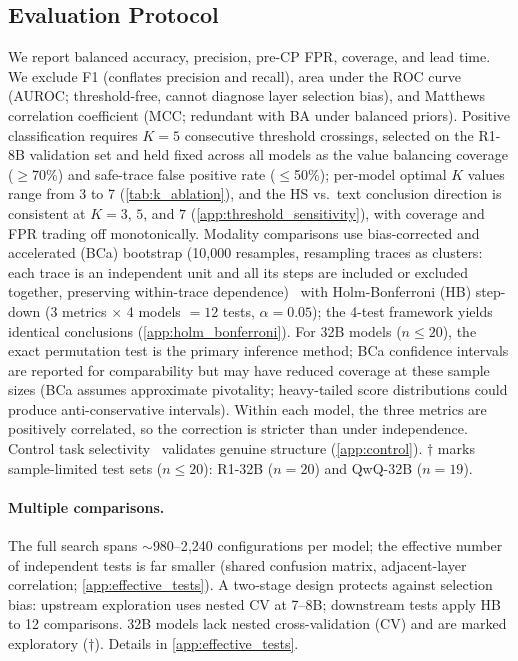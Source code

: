 \subsection{Evaluation Protocol}
\label{sec:evaluation}

We report balanced accuracy, precision, pre-CP FPR, coverage, and lead time. We exclude F1 (conflates precision and recall), area under the ROC curve (AUROC; threshold-free, cannot diagnose layer selection bias), and Matthews correlation coefficient (MCC; redundant with BA under balanced priors). Positive classification requires $K{=}5$ consecutive threshold crossings, selected on the R1-8B validation set and held fixed across all models as the value balancing coverage ($\geq$70\%) and safe-trace false positive rate ($\leq$50\%); per-model optimal $K$ values range from 3 to 7 (\cref{tab:k_ablation}), and the HS vs.\ text conclusion direction is consistent at $K{=}3$, $5$, and $7$ (\cref{app:threshold_sensitivity}), with coverage and FPR trading off monotonically. Modality comparisons use bias-corrected and accelerated (BCa) bootstrap (10{,}000 resamples, resampling traces as clusters: each trace is an independent unit and all its steps are included or excluded together, preserving within-trace dependence)~\citep{efron1993bootstrap,diciccio1996bootstrap} with Holm-Bonferroni (HB) step-down (3 metrics $\times$ 4 models $= 12$ tests, $\alpha{=}0.05$); the 4-test framework yields identical conclusions (\cref{app:holm_bonferroni}). For 32B models ($n \leq 20$), the exact permutation test is the primary inference method; BCa confidence intervals are reported for comparability but may have reduced coverage at these sample sizes (BCa assumes approximate pivotality; heavy-tailed score distributions could produce anti-conservative intervals). Within each model, the three metrics are positively correlated, so the correction is stricter than under independence. Control task selectivity~\citep{hewitt2019control} validates genuine structure (\cref{app:control}). $\dagger$ marks sample-limited test sets ($n \leq 20$): R1-32B ($n{=}20$) and QwQ-32B ($n{=}19$).

\paragraph{Multiple comparisons.} The full search spans ${\sim}$980--2{,}240 configurations per model; the effective number of independent tests is far smaller (shared confusion matrix, adjacent-layer correlation; \cref{app:effective_tests}). A two-stage design protects against selection bias: upstream exploration uses nested CV at 7--8B; downstream tests apply HB to 12 comparisons. 32B models lack nested cross-validation (CV) and are marked exploratory ($\dagger$). Details in \cref{app:effective_tests}.

